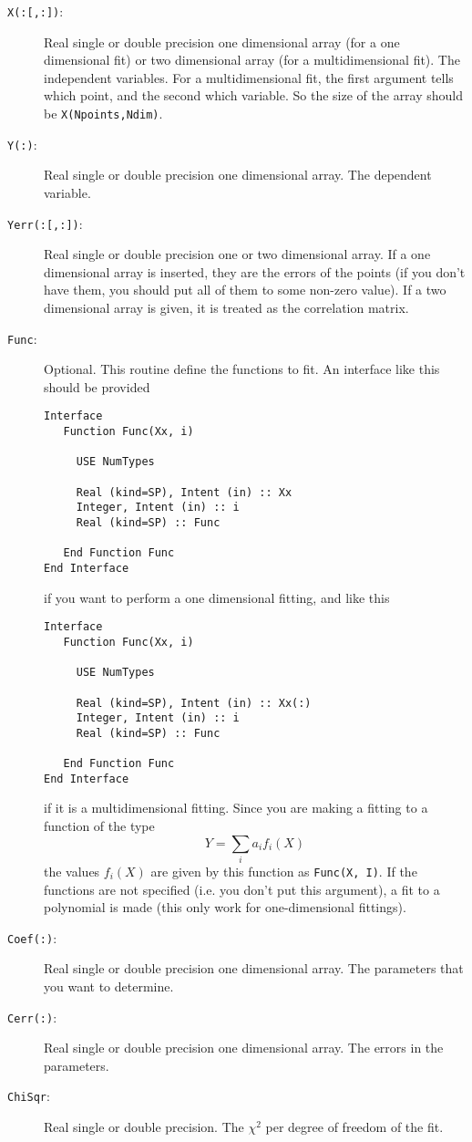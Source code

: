 \begin{description}
\item[\texttt{X(:[,:])}:] Real single or double precision one
  dimensional array (for a one dimensional fit) or two dimensional
  array (for a multidimensional fit). The
  independent variables. For a multidimensional fit, the first argument
  tells which point, and the second which variable. So the size of the
  array should be \texttt{X(Npoints,Ndim)}.
\item[\texttt{Y(:)}: ] Real single or double precision one dimensional
  array. The dependent
  variable.
\item[\texttt{Yerr(:[,:])}:] Real single or double precision one or
  two
  dimensional array. If a one dimensional array is inserted, they are
  the errors 
  of the points (if you don't have them, you should put all of them to
  some non-zero value). If a two dimensional array is given, it is
  treated as the correlation matrix.
\item[\texttt{Func}:] Optional. This routine define the functions to
  fit. An interface like this should be provided
\begin{verbatim}
Interface
   Function Func(Xx, i)
         
     USE NumTypes

     Real (kind=SP), Intent (in) :: Xx
     Integer, Intent (in) :: i
     Real (kind=SP) :: Func

   End Function Func
End Interface
\end{verbatim}
if you want to perform a one dimensional fitting, and like this
\begin{verbatim}
Interface
   Function Func(Xx, i)
         
     USE NumTypes

     Real (kind=SP), Intent (in) :: Xx(:)
     Integer, Intent (in) :: i
     Real (kind=SP) :: Func

   End Function Func
End Interface
\end{verbatim}
if it is a multidimensional fitting. Since you are making a fitting
to a function of the type
\begin{displaymath}
  Y = \sum_i a_i f_i(X)
\end{displaymath}
the values $f_i(X)$ are given by this function as \texttt{Func(X,
  I)}. If the functions are not specified (i.e. you don't put this
argument), a fit to a polynomial is made (this only work for
one-dimensional fittings).
\item[\texttt{Coef(:)}: ] Real single or double precision one
  dimensional array. The
  parameters that you want to determine.
\item[\texttt{Cerr(:)}:] Real single or double precision one
  dimensional array. The errors
  in the parameters.
\item[\texttt{ChiSqr}: ] Real single or double precision. The $\chi^2$
  per degree of freedom of the fit.
\end{description}

